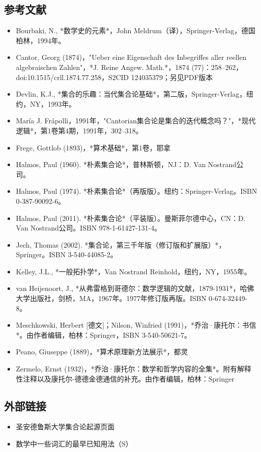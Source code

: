 \subsection{参考文献}   
\begin{itemize}
\item Bourbaki, N., *数学史的元素*，John Meldrum（译），Springer-Verlag，德国柏林，1994年。  
\item Cantor, Georg (1874)，"Ueber eine Eigenschaft des Inbegriffes aller reellen algebraischen Zahlen"，*J. Reine Angew. Math.*，1874 (77)：258–262，doi:10.1515/crll.1874.77.258，S2CID 124035379；另见PDF版本  
\item Devlin, K.J., *集合的乐趣：当代集合论基础*，第二版，Springer-Verlag，纽约，NY，1993年。  
\item María J. Frápolli，1991年，"Cantorian集合论是集合的迭代概念吗？"，*现代逻辑*，第1卷第4期，1991年，302–318。
\item Frege, Gottlob (1893)，*算术基础*，第1卷，耶拿  
\item Halmos, Paul (1960). *朴素集合论*，普林斯顿，NJ：D. Van Nostrand公司。  
\item Halmos, Paul (1974). *朴素集合论*（再版版）。纽约：Springer-Verlag。ISBN 0-387-90092-6。  
\item Halmos, Paul (2011). *朴素集合论*（平装版）。曼斯菲尔德中心，CN：D. Van Nostrand公司。ISBN 978-1-61427-131-4。
\item Jech, Thomas (2002). *集合论，第三千年版（修订版和扩展版）*，Springer。ISBN 3-540-44085-2。  
\item Kelley, J.L., *一般拓扑学*，Van Nostrand Reinhold，纽约，NY，1955年。  
\item van Heijenoort, J., *从弗雷格到哥德尔：数学逻辑的文献，1879-1931*，哈佛大学出版社，剑桥，MA，1967年。1977年修订版再版。ISBN 0-674-32449-8。  
\item Meschkowski, Herbert [德文]；Nilson, Winfried (1991)，*乔治·康托尔：书信*。由作者编辑，柏林：Springer，ISBN 3-540-50621-7。
\item Peano, Giuseppe (1889)，*算术原理新方法展示*，都灵  
\item Zermelo, Ernst (1932)，*乔治·康托尔：数学和哲学内容的全集*。附有解释性注释以及康托尔-德德金德通信的补充。由作者编辑，柏林：Springer
\end{itemize}
\subsection{外部链接}  
\begin{itemize}
\item 圣安德鲁斯大学集合论起源页面  
\item 数学中一些词汇的最早已知用法（S）
\end{itemize}
